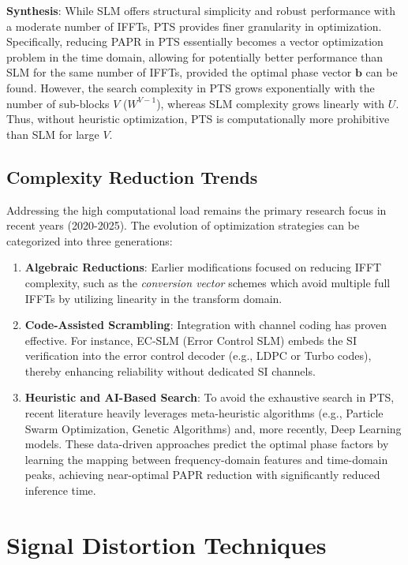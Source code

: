 \documentclass[journal]{IEEEtran}
\begin{document}
\textbf{Synthesis}: While SLM offers structural simplicity and robust performance with a moderate number of IFFTs, PTS provides finer granularity in optimization. Specifically, reducing PAPR in PTS essentially becomes a vector optimization problem in the time domain, allowing for potentially better performance than SLM for the same number of IFFTs, provided the optimal phase vector $\mathbf{b}$ can be found. However, the search complexity in PTS grows exponentially with the number of sub-blocks $V$ ($W^{V-1}$), whereas SLM complexity grows linearly with $U$. Thus, without heuristic optimization, PTS is computationally more prohibitive than SLM for large $V$.

\subsection{Complexity Reduction Trends}
Addressing the high computational load remains the primary research focus in recent years (2020-2025). The evolution of optimization strategies can be categorized into three generations:

\begin{enumerate}
    \item \textbf{Algebraic Reductions}: Earlier modifications focused on reducing IFFT complexity, such as the \textit{conversion vector} schemes \cite{ref7} which avoid multiple full IFFTs by utilizing linearity in the transform domain.
    \item \textbf{Code-Assisted Scrambling}: Integration with channel coding has proven effective. For instance, EC-SLM (Error Control SLM) \cite{ref8} embeds the SI verification into the error control decoder (e.g., LDPC or Turbo codes), thereby enhancing reliability without dedicated SI channels.
    \item \textbf{Heuristic and AI-Based Search}: To avoid the exhaustive search in PTS, recent literature heavily leverages meta-heuristic algorithms (e.g., Particle Swarm Optimization, Genetic Algorithms) and, more recently, Deep Learning models. These data-driven approaches predict the optimal phase factors by learning the mapping between frequency-domain features and time-domain peaks, achieving near-optimal PAPR reduction with significantly reduced inference time.
\end{enumerate}

\section{Signal Distortion Techniques}
\end{document}

